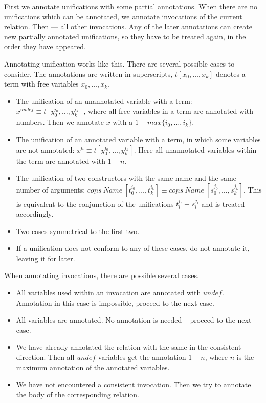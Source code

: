 \documentclass[submission,copyright,creativecommons]{eptcs}
\begin{document}
First we annotate unifications with some partial annotations.
When there are no unifications which can be annotated, we annotate invocations of the current relation.
Then --- all other invocations.
Any of the later annotations can create new partially annotated unifications, so they have to be treated again, in the order they have appeared.

Annotating unification works like this.
There are several possible cases to consider.
The annotations are written in superscripts, $t[x_0, \dots, x_k]$ denotes a term with free variables $x_0, \dots, x_k$.

\begin{itemize}
  \item The unification of an unannotated variable with a term: $x^{undef} \equiv t[y_0^{i_0},\dots, y_k^{i_k}]$, where all free variables in a term are annotated with numbers. Then we annotate $x$ with a $1+max\{i_0,\dots,i_k\}$.
  \item The unification of an annotated variable with a term, in which some variables are not annotated: $x^{n} \equiv t[y_0^{i_0},\dots, y_k^{i_k}]$. Here all unannotated variables within the term are annotated with $1+n$.
  \item The unification of two constructors with the same name and the same number of arguments: $\underline{cons} \ Name \ [t_0^{i_0}, \dots, t_k^{i_k}] \equiv \underline{cons} \ Name \ [s_0^{j_0}, \dots, s_k^{j_k}]$. This is equivalent to the conjunction of the unifications $t_l^{i_l} \equiv s_l^{j_l}$ and is treated accordingly.
  \item Two cases symmetrical to the first two.
  \item If a unification does not conform to any of these cases, do not annotate it, leaving it for later.
\end{itemize}

When annotating invocations, there are possible several cases.

\begin{itemize}
  \item All variables used within an invocation are annotated with $undef$. Annotation in this case is impossible, proceed to the next case.
  \item All variables are annotated. No annotation is needed -- proceed to the next case.
  \item We have already annotated the relation with the same in the consistent direction. Then all $undef$ variables get the annotation $1+n$, where $n$ is the maximum annotation of the annotated variables.
  \item We have not encountered a consistent invocation. Then we try to annotate the body of the corresponding relation.
\end{itemize}



\nocite{*}


\end{document}
